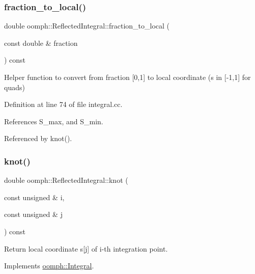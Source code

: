 \subsubsection{\texorpdfstring{fraction\+\_\+to\+\_\+local()}{fraction\_to\_local()}}
{\footnotesize\ttfamily double oomph\+::\+Reflected\+Integral\+::fraction\+\_\+to\+\_\+local (\begin{DoxyParamCaption}\item[{const double \&}]{fraction }\end{DoxyParamCaption}) const\hspace{0.3cm}{\ttfamily [private]}}



Helper function to convert from fraction \mbox{[}0,1\mbox{]} to local coordinate (s in \mbox{[}-\/1,1\mbox{]} for quads) 



Definition at line 74 of file integral.\+cc.



References S\+\_\+max, and S\+\_\+min.



Referenced by knot().

\mbox{\label{classoomph_1_1ReflectedIntegral_af315971c60753e39fca60c108da3e5c0}} 
\subsubsection{\texorpdfstring{knot()}{knot()}}
{\footnotesize\ttfamily double oomph\+::\+Reflected\+Integral\+::knot (\begin{DoxyParamCaption}\item[{const unsigned \&}]{i,  }\item[{const unsigned \&}]{j }\end{DoxyParamCaption}) const\hspace{0.3cm}{\ttfamily [virtual]}}



Return local coordinate s\mbox{[}j\mbox{]} of i-\/th integration point. 



Implements \hyperlink{classoomph_1_1Integral_a1a2122f99a87c18649bafdd9ed739758}{oomph\+::\+Integral}.



